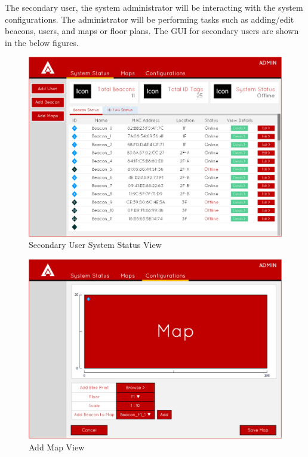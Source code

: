 \pagebreak
The secondary user, the system administrator will be interacting with the system configurations. The administrator will be performing tasks such as adding/edit beacons, users, and maps or floor plans. The GUI for secondary users are shown in the below figures.

\medskip
\begin{figure}[H]
\centering
    \includegraphics[scale=0.45]{./images/UIMU_status_IT.png}
    \caption{Secondary User System Status View}
    \label{ss_it}
\end{figure}

\medskip
\begin{figure}[H]
\centering
    \includegraphics[scale=0.45]{./images/UIMU_add_map.png}
    \caption{Add Map View}
    \label{add_map}
\end{figure}
\pagebreak


